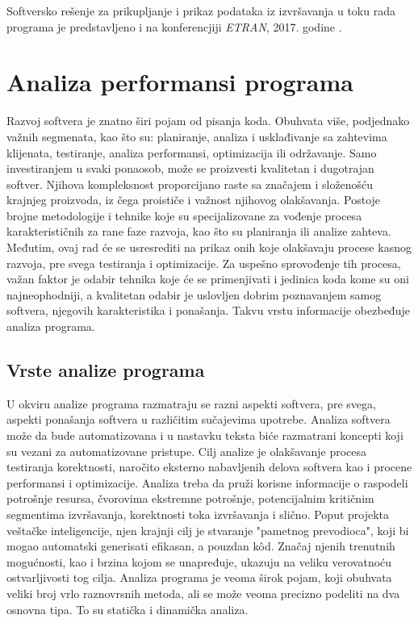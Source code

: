 \documentclass[12pt,oneside]{memoir}
\newcommand{\strano}[1]{\textit{#1}}
\begin{document}
Softversko rešenje za prikupljanje i prikaz podataka iz izvršavanja u toku rada programa je predstavljeno i na konferencjiji \strano{ETRAN}, 2017. godine \cite{ETRAN}. 

\chapter{Analiza performansi programa}


Razvoj softvera je znatno širi pojam od pisanja koda. Obuhvata više, podjednako važnih segmenata, kao što su: planiranje, analiza i usklađivanje sa zahtevima klijenata, testiranje, analiza performansi, optimizacija ili održavanje. Samo investiranjem u svaki ponaosob, može se proizvesti kvalitetan i dugotrajan softver. Njihova kompleksnost proporcijano raste sa značajem i složenošću krajnjeg proizvoda, iz čega proističe i važnost njihovog olakšavanja. Postoje brojne metodologije i tehnike koje su specijalizovane za vođenje procesa karakterističnih za rane faze razvoja, kao što su planiranja ili analize zahteva. Međutim, ovaj rad će se usresrediti na prikaz onih koje olakšavaju procese kasnog razvoja, pre svega testiranja i optimizacije. Za uspešno sprovođenje tih procesa, važan faktor je odabir tehnika koje će se primenjivati i jedinica koda kome su oni najneophodniji, a kvalitetan odabir je uslovljen dobrim poznavanjem samog softvera, njegovih karakteristika i ponašanja. Takvu vrstu informacije obezbeđuje analiza programa.

\section{Vrste analize programa}

U okviru analize programa razmatraju se razni aspekti softvera, pre svega, aspekti ponašanja softvera u različitim sučajevima upotrebe. Analiza softvera može da bude automatizovana i u nastavku teksta biće razmatrani koncepti koji su vezani za automatizovane pristupe. Cilj analize je olakšavanje procesa testiranja korektnosti, naročito eksterno nabavljenih delova softvera kao i procene performansi i optimizacije. Analiza treba da pruži korisne informacije o raspodeli potrošnje resursa, čvorovima ekstremne potrošnje, potencijalnim kritičnim segmentima izvršavanja, korektnosti toka izvršavanja i slično. Poput projekta veštačke inteligencije, njen krajnji cilj je stvaranje "pametnog prevodioca", koji bi mogao automatski generisati efikasan, a pouzdan k\^{o}d. Značaj njenih trenutnih mogućnosti, kao i brzina kojom se unapređuje, ukazuju na veliku verovatnoću ostvarljivosti tog cilja. Analiza programa je veoma širok pojam, koji obuhvata veliki broj vrlo raznovrsnih metoda, ali se može veoma precizno podeliti na dva osnovna tipa. To su statička i dinamička analiza.
\end{document}
